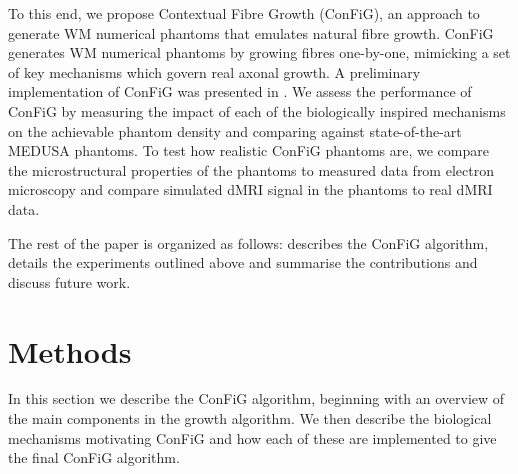 To this end, we propose Contextual Fibre Growth (ConFiG), an approach to generate WM numerical phantoms that emulates natural fibre growth. ConFiG generates WM numerical phantoms by growing fibres one-by-one, mimicking a set of key mechanisms which govern real axonal growth. A preliminary implementation of ConFiG was presented in \cite{Callaghan2019}.
We assess the performance of ConFiG by measuring the impact of each of the biologically inspired mechanisms on the achievable phantom density and comparing against state-of-the-art MEDUSA phantoms.
To test how realistic ConFiG phantoms are, we compare the microstructural properties of the phantoms to measured data from electron microscopy and compare simulated dMRI signal in the phantoms to real dMRI data.

The rest of the paper is organized as follows:  describes the ConFiG algorithm,  details the experiments outlined above and  summarise the contributions and discuss future work.

\section{Methods}
\label{sec:config_methods}
In this section we describe the ConFiG algorithm, beginning with an overview of the main components in the growth algorithm. We then describe the biological mechanisms motivating ConFiG and how each of these are implemented to give the final ConFiG algorithm.


